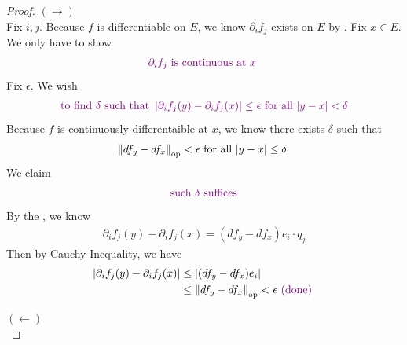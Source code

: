 \documentclass{report}
\begin{document}
\begin{proof}
$(\longrightarrow)$\\

Fix $i,j$. Because $f$ is differentiable on $E$, we know  $\partial_i f_j$ exists on $E$ by . Fix $x \in E$. We only have to show 
\begin{align*}
  \textcolor{violet}{\partial_i f_j\text{ is continuous at $x$ }}
\end{align*}
Fix $\epsilon $. We wish 
\begin{align*}
\textcolor{violet}{\text{ to find }\delta\text{ such that } \left|\partial_i f_j(y)-\partial_i f_j(x)\right|\leq \epsilon \text{ for all $\left|y-x\right|<\delta$ }}
\end{align*}
Because $f$ is continuously differentaible at $x$, we know there exists  $\delta$ such that 
\begin{align*}
\left\| df_y-df_x \right\|_\text{op}< \epsilon \text{ for all $\left|y-x\right|\leq \delta$ }
\end{align*}
We claim 
\begin{align*}
\textcolor{violet}{\text{ such $\delta$ suffices }}
\end{align*}
By the , we know
\begin{align*}
\partial_i f_j(y)-\partial_i f_j(x)=(df_y-df_x)e_i \cdot q_j
\end{align*}
Then by Cauchy-Inequality, we have 
\begin{align*}
  \left|\partial_i f_j(y)-\partial_if_j(x)\right|&\leq \left|(df_y-df_x)e_i\right|\\
  &\leq \left\| df_y-df_x \right\|_\text{op}<\epsilon \textcolor{violet}{\text{ (done) }}
\end{align*}

$(\longleftarrow)$\\


\end{proof}
\end{document}
